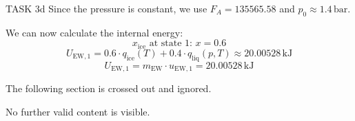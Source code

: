 TASK 3d  
Since the pressure is constant, we use \( F_A = 135565.58 \) and \( p_0 \approx 1.4 \, \text{bar} \).  

We can now calculate the internal energy:  
\[
x_{\text{ice}} \text{ at state 1: } x = 0.6
\]  
\[
U_{\text{EW},1} = 0.6 \cdot q_{\text{ice}}(T) + 0.4 \cdot q_{\text{liq}}(p,T) \approx 20.00528 \, \text{kJ}
\]  
\[
U_{\text{EW},1} = m_{\text{EW}} \cdot u_{\text{EW},1} = 20.00528 \, \text{kJ}
\]  

The following section is crossed out and ignored.  

No further valid content is visible.